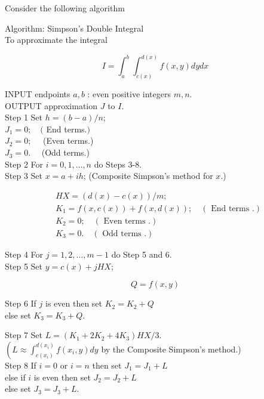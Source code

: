 \begin{myexercise}%
Consider the following algorithm

\begin{boxB}Algorithm: Simpson's Double Integral\\
To approximate the integral

$$
I=\int_{a}^{b} \int_{c(x)}^{d(x)} f(x, y) d y d x
$$

INPUT endpoints $a, b$ : even positive integers $m, n$.\\
OUTPUT approximation $J$ to $I$.\\
Step 1 Set $h=(b-a) / n$;\\
\hspace*{2cm}$J_{1}=0 ; \quad($ End terms.$)$\\
\hspace*{2cm}$J_{2}=0 ; \quad$ (Even terms.)\\
\hspace*{2cm}$J_{3}=0 . \quad$ (Odd terms.)\\
Step 2 For $i=0,1, \ldots, n$ do Steps 3-8.\\
\hspace*{1cm}Step 3 Set $x=a+i h$; (Composite Simpson's method for $x$.)

$$
\begin{aligned}
& H X=(d(x)-c(x)) / m ; \\
& K_{1}=f(x, c(x))+f(x, d(x)) ; \quad(\text { End terms } .) \\
& K_{2}=0 ; \quad(\text { Even terms } .) \\
& K_{3}=0 . \quad(\text { Odd terms } .)
\end{aligned}
$$

\hspace*{1cm}Step 4 For $j=1,2, \ldots, m-1$ do Step 5 and 6.\\
\hspace*{2.5cm}Step 5 Set $y=c(x)+j H X$;

$$
Q=f(x, y)
$$

\hspace*{2.5cm}Step 6 If $j$ is even then set $K_{2}=K_{2}+Q$\\
\hspace*{4cm} else set $K_{3}=K_{3}+Q$.

Step 7 Set $L=\left(K_{1}+2 K_{2}+4 K_{3}\right) H X / 3$.\\
$\left(L \approx \int_{c\left(x_{i}\right)}^{d\left(x_{i}\right)} f\left(x_{i}, y\right) d y\right.$ by the Composite Simpson's method.)\\
Step 8 If $i=0$ or $i=n$ then set $J_{1}=J_{1}+L$\\
\hspace*{3cm} else if $i$ is even then set $J_{2}=J_{2}+L$ \\
\hspace*{3cm}else set $J_{3}=J_{3}+L$.


\end{boxB}
\end{myexercise}
